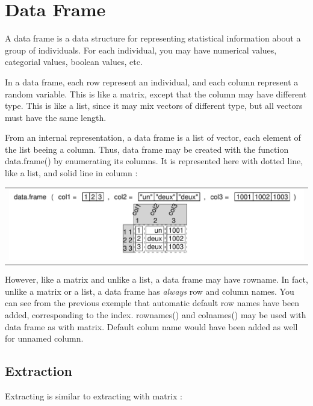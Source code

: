 \documentclass[pdflatex]{article}
\begin{document}
\section{Data Frame}

A data frame is a data structure for representing statistical information about
a group of individuals. For each individual, you may have numerical values,
categorial values, boolean values, etc.

In a data frame, each row represent an individual, and each column represent a
random variable. This is like a matrix, except that the column may have
different type. This is like a list, since it may mix vectors of different
type, but all vectors must have the same length.

From an internal representation, a data frame is a list of vector, each element
of the list beeing a column. Thus, data frame may be created with the function
data.frame() by enumerating its columns. It is represented here with dotted
line, like a list, and solid line in column :

\begin{tabular}{c}
\includegraphics{dataframe.pdf}
\end{tabular}

However, like a matrix and unlike a list, a data frame may have rowname. In
fact, unlike a matrix or a list, a data frame has \emph{always} row and column
names. You can see from the previous exemple that automatic default row names
have been added, corresponding to the index. rownames() and colnames() may be
used with data frame as with matrix. Default colum name would have been added
as well for unnamed column. 

\subsection{Extraction}

Extracting is similar to extracting with matrix :
\end{document}
